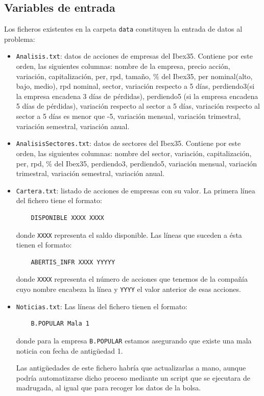 \documentclass[a4paper,11pt]{article}
\begin{document}
\subsection{Variables de entrada}
Los ficheros existentes en la carpeta \texttt{data} constituyen la entrada de datos al problema:

\begin{itemize}
 \item \texttt{Analisis.txt}: datos de acciones de empresas del Ibex35. Contiene por este orden, las siguientes columnas:
 nombre de la empresa, precio acción, variación, capitalización, per, rpd, tamaño, \% del Ibex35, per nominal(alto, bajo, medio), rpd nominal,
 sector, variación respecto a 5 días, perdiendo3(si la empresa encadena 3 días de pérdidas), perdiendo5 (si la empresa encadena
 5 días de pérdidas), variación respecto al sector a 5 días, variación respecto al sector a 5 días es menor que -5, variación
 mensual, variación trimestral, variación semestral, variación anual.
 \item \texttt{AnalisisSectores.txt}: datos de sectores del Ibex35. Contiene por este orden, las siguientes columnas:
 nombre del sector, variación, capitalización, per, rpd, \% del Ibex35, perdiendo3, perdiendo5, variación mensual, variación
 trimestral, variación semestral, variación anual.
 \item \texttt{Cartera.txt}: listado de acciones de empresas con su valor.
  La primera línea del fichero tiene el formato:
  \begin{verbatim}
    DISPONIBLE XXXX XXXX
  \end{verbatim}
  
  donde \texttt{XXXX} representa el saldo disponible.
  Las líneas que suceden a ésta tienen el formato:
  
  \begin{verbatim}
    ABERTIS_INFR XXXX YYYYY
  \end{verbatim}

  donde \texttt{XXXX} representa el número de acciones que tenemos de la compañía cuyo nombre encabeza la línea
  y \texttt{YYYY} el valor anterior de esas acciones.
  
 \item \texttt{Noticias.txt}: Las líneas del fichero tienen el formato:
  
  \begin{verbatim}
    B.POPULAR Mala 1
  \end{verbatim} 
 
  donde para la empresa \texttt{B.POPULAR} estamos asegurando que existe una mala noticia con fecha de antig\"uedad 1.
  
  Las antig\"uedades de este fichero habría que actualizarlas a mano, aunque podría automatizarse dicho proceso mediante un
  script que se ejecutara de madrugada, al igual que para recoger los datos de la bolsa.
\end{itemize}
\end{document}
